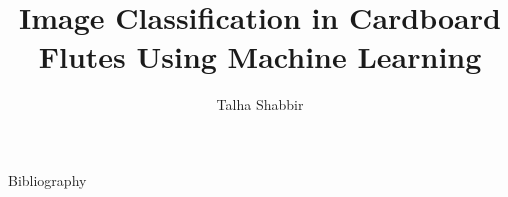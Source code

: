 \documentclass{styles/tthesis}
\title{Image Classification in Cardboard Flutes Using Machine Learning}
\author{Talha Shabbir}
\begin{document}
	
	
	\printfrontpage
	
	
	
	
	\thispagestyle{empty}
	\mbox{}
	\newpage
	
	
	
	\thispagestyle{empty}
	\mbox{}
	\newpage
	
\tableofcontents
\listoffigures

\mainmatter 









\backmatter

Bibliography

\label{Bibliography}


\end{document}

